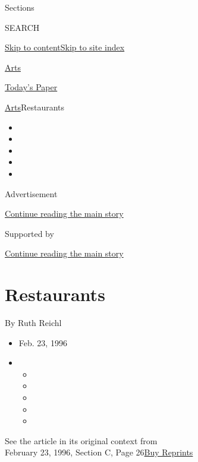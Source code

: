 Sections

SEARCH

\protect\hyperlink{site-content}{Skip to
content}\protect\hyperlink{site-index}{Skip to site index}

\href{https://www.nytimes3xbfgragh.onion/section/arts}{Arts}

\href{https://myaccount.nytimes3xbfgragh.onion/auth/login?response_type=cookie\&client_id=vi}{}

\href{https://www.nytimes3xbfgragh.onion/section/todayspaper}{Today's
Paper}

\href{/section/arts}{Arts}\textbar{}Restaurants

\begin{itemize}
\item
\item
\item
\item
\item
\end{itemize}

Advertisement

\protect\hyperlink{after-top}{Continue reading the main story}

Supported by

\protect\hyperlink{after-sponsor}{Continue reading the main story}

\hypertarget{restaurants}{%
\section{Restaurants}\label{restaurants}}

By Ruth Reichl

\begin{itemize}
\item
  Feb. 23, 1996
\item
  \begin{itemize}
  \item
  \item
  \item
  \item
  \item
  \end{itemize}
\end{itemize}

See the article in its original context from\\
February 23, 1996, Section C, Page
26\href{https://store.nytimes3xbfgragh.onion/collections/new-york-times-page-reprints?utm_source=nytimes\&utm_medium=article-page\&utm_campaign=reprints}{Buy
Reprints}


